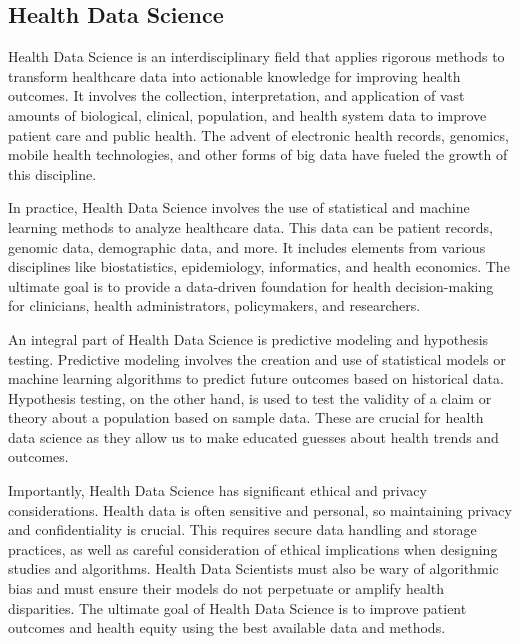 \subsection{Health Data Science}

Health Data Science is an interdisciplinary field that applies rigorous methods to transform healthcare data into actionable knowledge for improving health outcomes. It involves the collection, interpretation, and application of vast amounts of biological, clinical, population, and health system data to improve patient care and public health. The advent of electronic health records, genomics, mobile health technologies, and other forms of big data have fueled the growth of this discipline.

In practice, Health Data Science involves the use of statistical and machine learning methods to analyze healthcare data. This data can be patient records, genomic data, demographic data, and more. It includes elements from various disciplines like biostatistics, epidemiology, informatics, and health economics. The ultimate goal is to provide a data-driven foundation for health decision-making for clinicians, health administrators, policymakers, and researchers.

An integral part of Health Data Science is predictive modeling and hypothesis testing. Predictive modeling involves the creation and use of statistical models or machine learning algorithms to predict future outcomes based on historical data. Hypothesis testing, on the other hand, is used to test the validity of a claim or theory about a population based on sample data. These are crucial for health data science as they allow us to make educated guesses about health trends and outcomes.

Importantly, Health Data Science has significant ethical and privacy considerations. Health data is often sensitive and personal, so maintaining privacy and confidentiality is crucial. This requires secure data handling and storage practices, as well as careful consideration of ethical implications when designing studies and algorithms. Health Data Scientists must also be wary of algorithmic bias and must ensure their models do not perpetuate or amplify health disparities. The ultimate goal of Health Data Science is to improve patient outcomes and health equity using the best available data and methods.


